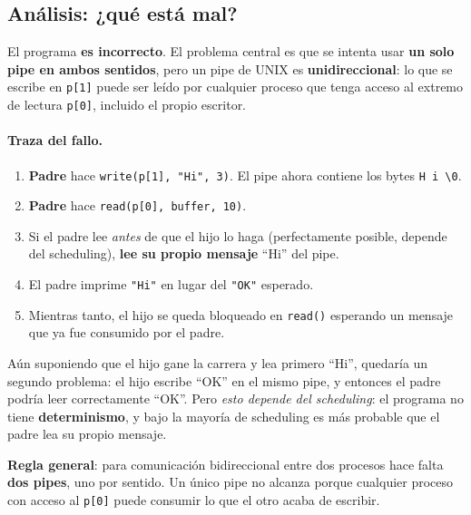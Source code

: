 \documentclass[11pt,a4paper]{article}
\begin{document}
\subsection*{Análisis: ¿qué está mal?}

El programa \textbf{es incorrecto}. El problema central es que se
intenta usar \textbf{un solo pipe en ambos sentidos}, pero un pipe
de UNIX es \textbf{unidireccional}: lo que se escribe en \texttt{p[1]}
puede ser leído por cualquier proceso que tenga acceso al extremo de
lectura \texttt{p[0]}, incluido el propio escritor.

\paragraph{Traza del fallo.}

\begin{enumerate}[leftmargin=*]
    \item \textbf{Padre} hace \texttt{write(p[1], "Hi", 3)}. El pipe
        ahora contiene los bytes \texttt{H i \textbackslash 0}.
    \item \textbf{Padre} hace \texttt{read(p[0], buffer, 10)}.
    \item Si el padre lee \emph{antes} de que el hijo lo haga
        (perfectamente posible, depende del scheduling), \textbf{lee
        su propio mensaje} ``Hi'' del pipe.
    \item El padre imprime \texttt{"Hi"} en lugar del \texttt{"OK"}
        esperado.
    \item Mientras tanto, el hijo se queda bloqueado en
        \texttt{read()} esperando un mensaje que ya fue consumido por
        el padre.
\end{enumerate}

Aún suponiendo que el hijo gane la carrera y lea primero ``Hi'',
quedaría un segundo problema: el hijo escribe ``OK'' en el mismo
pipe, y entonces el padre podría leer correctamente ``OK''. Pero
\emph{esto depende del scheduling}: el programa no tiene
\textbf{determinismo}, y bajo la mayoría de scheduling es más
probable que el padre lea su propio mensaje.

\begin{importante}
\textbf{Regla general}: para comunicación bidireccional entre dos
procesos hace falta \textbf{dos pipes}, uno por sentido. Un único
pipe no alcanza porque cualquier proceso con acceso al \texttt{p[0]}
puede consumir lo que el otro acaba de escribir.
\end{importante}
\end{document}
